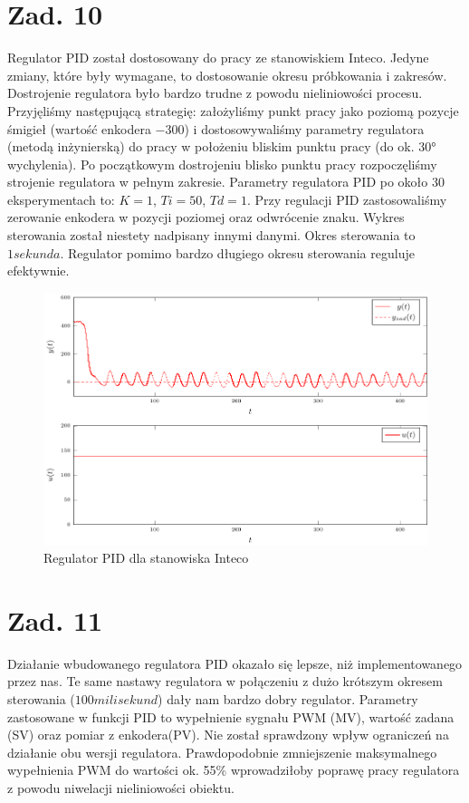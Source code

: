 \documentclass[a4paper,titlepage,11pt,twosides,floatssmall]{mwrep}
\begin{document}
\endgroup

\chapter{Zad. 10}

Regulator PID został dostosowany do pracy ze stanowiskiem Inteco. Jedyne zmiany, które były wymagane, to dostosowanie okresu próbkowania i zakresów. Dostrojenie regulatora było bardzo trudne z powodu nieliniowości procesu. Przyjęliśmy następującą strategię: założyliśmy punkt pracy jako poziomą pozycje śmigieł (wartość enkodera $-300$) i dostosowywaliśmy parametry regulatora (metodą inżynierską) do pracy w położeniu bliskim punktu pracy (do ok. 30° wychylenia). Po początkowym dostrojeniu blisko punktu pracy rozpoczęliśmy strojenie regulatora w pełnym zakresie. Parametry regulatora PID po około $30$ eksperymentach to: $K = 1$, $Ti = 50$, $Td = 1$. Przy regulacji PID zastosowaliśmy zerowanie enkodera w pozycji poziomej oraz odwrócenie znaku. Wykres sterowania został niestety nadpisany innymi danymi. Okres sterowania to $1 sekunda$. Regulator pomimo bardzo długiego okresu sterowania reguluje efektywnie. 

\begin{figure}[]
	\centering
	\includegraphics[scale=1]{../wykresy/zad10_pid.pdf}
	\caption{Regulator PID dla stanowiska Inteco}
	\label{zad10_pid}
\end{figure}

\chapter{Zad. 11}

Działanie wbudowanego regulatora PID okazało się lepsze, niż implementowanego przez nas. Te same nastawy regulatora w połączeniu z dużo krótszym okresem sterowania ($100 milisekund$) dały nam bardzo dobry regulator. Parametry zastosowane w funkcji PID to wypełnienie sygnału PWM (MV), wartość zadana (SV) oraz pomiar z enkodera(PV). Nie został sprawdzony wpływ ograniczeń na działanie obu wersji regulatora. Prawdopodobnie zmniejszenie maksymalnego wypełnienia PWM do wartości ok. 55\% wprowadziłoby poprawę pracy regulatora z powodu niwelacji nieliniowości obiektu.
\end{document}
